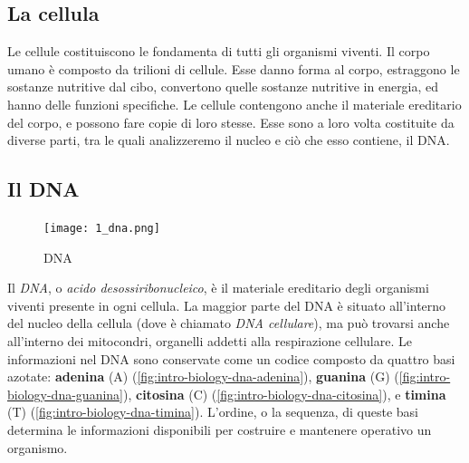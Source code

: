 \subsection{La cellula}
\label{chap:intro-biology-cell}

Le cellule costituiscono le fondamenta di tutti gli organismi viventi. Il corpo umano è composto da trilioni di cellule. Esse danno forma al corpo, estraggono le sostanze nutritive dal cibo, convertono quelle sostanze nutritive in energia, ed hanno delle funzioni specifiche. Le cellule contengono anche il materiale ereditario del corpo, e possono fare copie di loro stesse. Esse sono a loro volta costituite da diverse parti, tra le quali analizzeremo il nucleo e ciò che esso contiene, il DNA.

\subsection{Il DNA}
\label{chap:intro-biology-dna}

\begin{figure}
    \centering
    \texttt{[image: 1\_dna.png]}
    \caption{DNA}
    \label{fig:intro-biology-dna}
\end{figure}

Il \textit{DNA}, o \textit{acido desossiribonucleico}, è il materiale ereditario degli organismi viventi presente in ogni cellula. La maggior parte del DNA è situato all'interno del nucleo della cellula (dove è chiamato \textit{DNA cellulare}), ma può trovarsi anche all'interno dei mitocondri, organelli addetti alla respirazione cellulare. Le informazioni nel DNA sono conservate come un codice composto da quattro basi azotate: \textbf{adenina} (A) (\autoref{fig:intro-biology-dna-adenina}), \textbf{guanina} (G) (\autoref{fig:intro-biology-dna-guanina}), \textbf{citosina} (C) (\autoref{fig:intro-biology-dna-citosina}), e \textbf{timina} (T) (\autoref{fig:intro-biology-dna-timina}). L'ordine, o la sequenza, di queste basi determina le informazioni disponibili per costruire e mantenere operativo un organismo.

